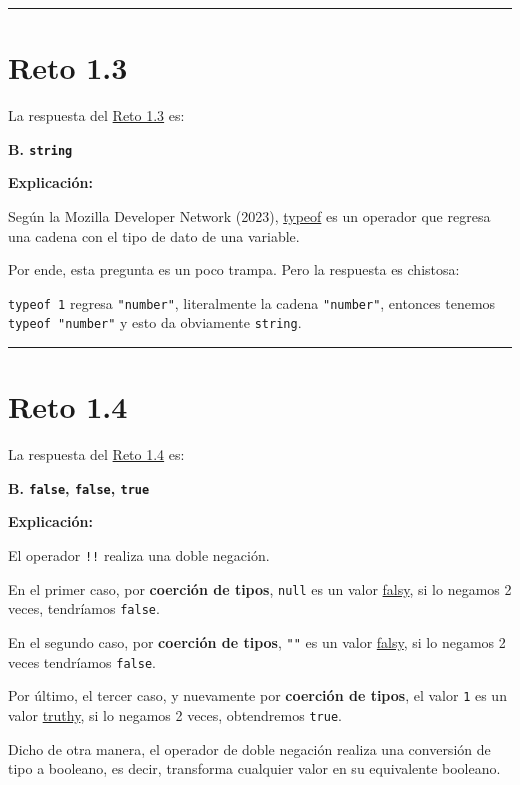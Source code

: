\documentclass[
  letterpaper,
  DIV=11,
  numbers=noendperiod]{scrreprt}
\begin{document}
\begin{center}\rule{0.5\linewidth}{0.5pt}\end{center}

\section{Reto 1.3}\label{sec-sol-cap1-reto3}

La respuesta del \hyperref[sec-cap1-reto3]{Reto 1.3} es:

\textbf{B. \texttt{string}}

\textbf{Explicación:}

Según la Mozilla Developer Network (2023),
\hyperref[glos-typeof]{typeof} es un operador que regresa una cadena con
el tipo de dato de una variable.

Por ende, esta pregunta es un poco trampa. Pero la respuesta es
chistosa:

\texttt{typeof\ 1} regresa \texttt{"number"}, literalmente la cadena
\texttt{"number"}, entonces tenemos \texttt{typeof\ "number"} y esto da
obviamente \texttt{string}.

\begin{center}\rule{0.5\linewidth}{0.5pt}\end{center}

\section{Reto 1.4}\label{sec-sol-cap1-reto4}

La respuesta del \hyperref[sec-cap1-reto4]{Reto 1.4} es:

\textbf{B. \texttt{false}, \texttt{false}, \texttt{true}}

\textbf{Explicación:}

El operador \texttt{!!} realiza una doble negación.

En el primer caso, por \textbf{coerción de tipos}, \texttt{null} es un
valor \hyperref[glos-falsy]{falsy}, si lo negamos 2 veces, tendríamos
\texttt{false}.

En el segundo caso, por \textbf{coerción de tipos}, \texttt{""} es un
valor \hyperref[glos-falsy]{falsy}, si lo negamos 2 veces tendríamos
\texttt{false}.

Por último, el tercer caso, y nuevamente por \textbf{coerción de tipos},
el valor \texttt{1} es un valor \hyperref[glos-truthy]{truthy}, si lo
negamos 2 veces, obtendremos \texttt{true}.

Dicho de otra manera, el operador de doble negación realiza una
conversión de tipo a booleano, es decir, transforma cualquier valor en
su equivalente booleano.
\end{document}
